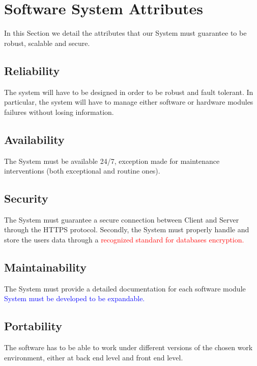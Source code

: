 \section{Software System Attributes}
In this Section we detail the attributes that our System must guarantee to be robust, scalable and secure.

\subsection{Reliability} 
The system will have to be designed in order to be robust and fault tolerant. In particular, the system will have to manage either software or hardware modules failures without losing information.

\subsection{Availability}
The System must be available 24/7, exception made for maintenance interventions (both exceptional and routine ones).

\subsection{Security}
The System must guarantee a secure connection between Client and Server through the HTTPS protocol. 
Secondly, the System must properly handle and store the users data through a \textcolor{red}{recognized standard for databases encryption.} 

\subsection{Maintainability}
The System must provide a detailed documentation for each software module
\textcolor{blue}{System must be developed to be expandable.}

\subsection{Portability}

The software has to be able to work under different versions of the chosen work environment, either at back end level and front end level.